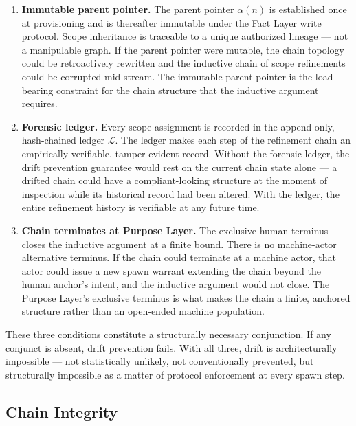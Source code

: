 \begin{enumerate}
    \item[(1)] \textbf{Immutable parent pointer.} The parent pointer $\alpha(n)$ is established once at provisioning and is thereafter immutable under the Fact Layer write protocol. Scope inheritance is traceable to a unique authorized lineage — not a manipulable graph. If the parent pointer were mutable, the chain topology could be retroactively rewritten and the inductive chain of scope refinements could be corrupted mid-stream. The immutable parent pointer is the load-bearing constraint for the chain structure that the inductive argument requires.

    \item[(2)] \textbf{Forensic ledger.} Every scope assignment is recorded in the append-only, hash-chained ledger $\mathcal{L}$. The ledger makes each step of the refinement chain an empirically verifiable, tamper-evident record. Without the forensic ledger, the drift prevention guarantee would rest on the current chain state alone — a drifted chain could have a compliant-looking structure at the moment of inspection while its historical record had been altered. With the ledger, the entire refinement history is verifiable at any future time.

    \item[(3)] \textbf{Chain terminates at Purpose Layer.} The exclusive human terminus closes the inductive argument at a finite bound. There is no machine-actor alternative terminus. If the chain could terminate at a machine actor, that actor could issue a new spawn warrant extending the chain beyond the human anchor's intent, and the inductive argument would not close. The Purpose Layer's exclusive terminus is what makes the chain a finite, anchored structure rather than an open-ended machine population.
\end{enumerate}

These three conditions constitute a structurally necessary conjunction. If any conjunct is absent, drift prevention fails. With all three, drift is architecturally impossible — not statistically unlikely, not conventionally prevented, but structurally impossible as a matter of protocol enforcement at every spawn step.

\subsection{Chain Integrity}
\label{sec:rs-chain-integrity}

